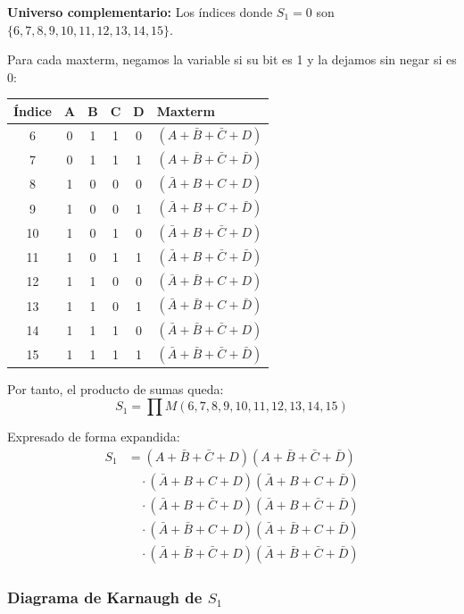 \documentclass[11pt,a4paper]{article}
\begin{document}
\textbf{Universo complementario:} Los índices donde $S_1 = 0$ son $\{6,7,8,9,10,11,12,13,14,15\}$.

Para cada maxterm, negamos la variable si su bit es 1 y la dejamos sin negar si es 0:

\begin{center}
\begin{tabular}{|c|c|c|c|c|l|}
\hline
\textbf{Índice} & A & B & C & D & \textbf{Maxterm} \\
\hline
6  & 0 & 1 & 1 & 0 & $(A + \bar{B} + \bar{C} + D)$ \\
7  & 0 & 1 & 1 & 1 & $(A + \bar{B} + \bar{C} + \bar{D})$ \\
8  & 1 & 0 & 0 & 0 & $(\bar{A} + B + C + D)$ \\
9  & 1 & 0 & 0 & 1 & $(\bar{A} + B + C + \bar{D})$ \\
10 & 1 & 0 & 1 & 0 & $(\bar{A} + B + \bar{C} + D)$ \\
11 & 1 & 0 & 1 & 1 & $(\bar{A} + B + \bar{C} + \bar{D})$ \\
12 & 1 & 1 & 0 & 0 & $(\bar{A} + \bar{B} + C + D)$ \\
13 & 1 & 1 & 0 & 1 & $(\bar{A} + \bar{B} + C + \bar{D})$ \\
14 & 1 & 1 & 1 & 0 & $(\bar{A} + \bar{B} + \bar{C} + D)$ \\
15 & 1 & 1 & 1 & 1 & $(\bar{A} + \bar{B} + \bar{C} + \bar{D})$ \\
\hline
\end{tabular}
\end{center}

Por tanto, el producto de sumas queda:
\[S_1 = \prod M(6,7,8,9,10,11,12,13,14,15)\]

Expresado de forma expandida:
\begin{align*}
S_1 &= (A + \bar{B} + \bar{C} + D)(A + \bar{B} + \bar{C} + \bar{D}) \\
&\quad \cdot (\bar{A} + B + C + D)(\bar{A} + B + C + \bar{D}) \\
&\quad \cdot (\bar{A} + B + \bar{C} + D)(\bar{A} + B + \bar{C} + \bar{D}) \\
&\quad \cdot (\bar{A} + \bar{B} + C + D)(\bar{A} + \bar{B} + C + \bar{D}) \\
&\quad \cdot (\bar{A} + \bar{B} + \bar{C} + D)(\bar{A} + \bar{B} + \bar{C} + \bar{D})
\end{align*}

\subsubsection*{Diagrama de Karnaugh de $S_1$}
\end{document}
